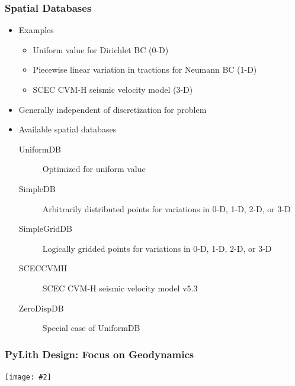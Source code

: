 \documentclass[aspectratio=169,hyperref=colorlinks]{beamer}
\newcommand{\includefigure}[2][]{{\centering\texttt{[image: \#2]}\par}}
\begin{document}
\begin{frame}
  \frametitle{Spatial Databases}

  \begin{itemize}
 \item Examples
    \begin{itemize}
    \item Uniform value for Dirichlet BC (0-D)
    \item Piecewise linear variation in tractions for Neumann BC (1-D)
    \item SCEC CVM-H seismic velocity model (3-D)
    \end{itemize}
  \item Generally independent of discretization for problem
  \item Available spatial databases
    \begin{description}
    \item[UniformDB] Optimized for uniform value
    \item[SimpleDB] Arbitrarily distributed points for variations in 0-D, 1-D, 2-D, or 3-D
    \item[SimpleGridDB] Logically gridded points for variations in 0-D, 1-D, 2-D, or 3-D
    \item[SCECCVMH] SCEC CVM-H seismic velocity model v5.3
    \item[ZeroDispDB] Special case of UniformDB
    \end{description}
 \end{itemize}

\end{frame}

\begin{frame}
  \frametitle{PyLith Design: Focus on Geodynamics}

  \includefigure[height=7.0cm]{figs/packages}

\end{frame}
\end{document}
